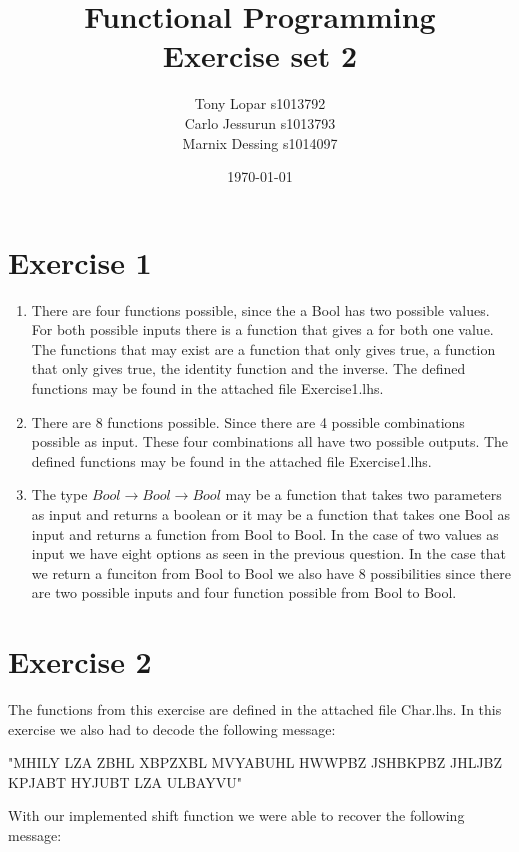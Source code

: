 \documentclass{article}
\begin{document}
\title{Functional Programming \\ Exercise set 2}
\date{\today}
\author{Tony Lopar s1013792 \\ Carlo Jessurun s1013793 \\ Marnix Dessing s1014097}
\maketitle

\section*{Exercise 1}
\begin{enumerate}
  \item There are four functions possible, since the a Bool has two possible values. For both possible inputs there is a function that gives a for both one value. The functions that may exist are a function that only gives true, a function that only gives true, the identity function and the inverse. The defined functions may be found in the attached file Exercise1.lhs.
  \item There are 8 functions possible. Since there are 4 possible combinations possible as input. These four combinations all have two possible outputs. The defined functions may be found in the attached file Exercise1.lhs.
  \item The type $Bool \rightarrow Bool \rightarrow Bool$ may be a function that takes two parameters as input and returns a boolean or it may be a function that takes one Bool as input and returns a function from Bool to Bool. In the case of two values as input we have eight options as seen in the previous question. In the case that we return a funciton from Bool to Bool we also have 8 possibilities since there are two possible inputs and four function possible from Bool to Bool.
\end{enumerate}

\section*{Exercise 2}
The functions from this exercise are defined in the attached file Char.lhs. In this exercise we also had to decode the following message:

"MHILY LZA ZBHL XBPZXBL MVYABUHL HWWPBZ JSHBKPBZ JHLJBZ KPJABT HYJUBT LZA ULBAYVU"

With our implemented shift function we were able to recover the following message:
\end{document}
